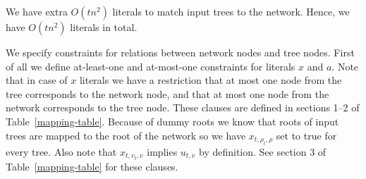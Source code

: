 \documentclass[runningheads, envcountsame, a4paper]{llncs}
\begin{document}
We have extra $O(tn^2)$ literals to match input trees to the network. Hence, we have $O(tn^2)$ literals in total.

We specify constraints for relations between network nodes and tree nodes. 
First of all we define at-least-one and at-most-one constraints for literals $x$ and $a$. Note that in case 
of $x$ literals we have a restriction that at most one node from the tree corresponds to the network node, and that at 
most one node from the network corresponds to the tree node. These clauses are defined in sections 1--2 of Table~\ref{mapping-table}.
Because of dummy roots we know that roots of input trees 
are mapped to the root of the network so we have $x_{t,\rho_t,\rho}$ set to true for every tree. Also 
note that $x_{t,v_t,v}$ implies $u_{t,v}$ by definition. See section 3 of Table~\ref{mapping-table} for these clauses.
\end{document}
